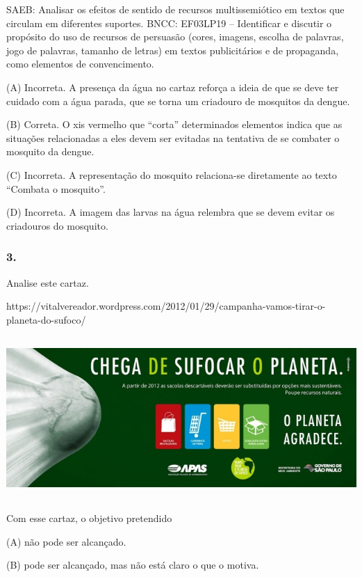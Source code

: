 SAEB: Analisar os efeitos de sentido de recursos multissemiótico em textos que circulam em diferentes suportes.
BNCC: EF03LP19 -- Identificar e discutir o propósito do uso de recursos de
persuasão (cores, imagens, escolha de palavras, jogo de palavras,
tamanho de letras) em textos publicitários e de propaganda, como
elementos de convencimento.

(A) Incorreta. A presença da água no cartaz reforça a ideia de que se deve ter cuidado com a água parada, que se torna um criadouro de mosquitos da dengue.

(B) Correta. O xis vermelho que ``corta'' determinados elementos indica que as situações relacionadas a eles devem ser evitadas na tentativa de se combater o mosquito da dengue.

(C) Incorreta. A representação do mosquito relaciona-se diretamente ao texto ``Combata o mosquito''.

(D) Incorreta. A imagem das larvas na água relembra que se devem evitar os criadouros do mosquito.

\subsubsection{3. }\label{section-46}

Analise este cartaz.

https://vitalvereador.wordpress.com/2012/01/29/campanha-vamos-tirar-o-planeta-do-sufoco/

\includegraphics[width=6.14514in,height=2.43088in]{media/image14.jpeg}


Com esse cartaz, o objetivo pretendido

(A) não pode ser alcançado.

(B) pode ser alcançado, mas não está claro o que o motiva.

